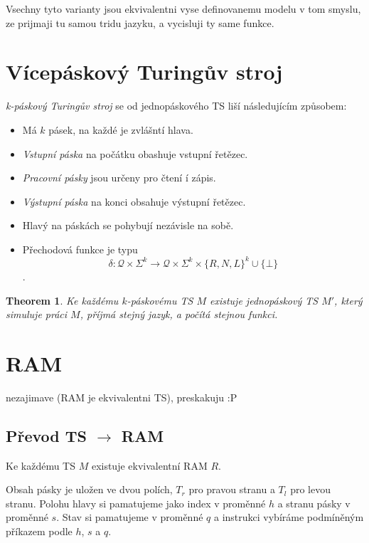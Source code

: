 \documentclass{article}
\theoremstyle{plain}
\newtheorem{thm}{Theorem}
\theoremstyle{plain}
\theoremstyle{remark}
\begin{document}
Vsechny tyto varianty jsou ekvivalentni vyse definovanemu modelu v tom smyslu, ze prijmaji tu samou tridu jazyku, a vycisluji ty same funkce.

\section{Vícepáskový Turingův stroj}

\emph{k-páskový Turingův stroj} se od jednopáskového TS liší následujícím způsobem:

\begin{itemize}
  \item Má $k$ pásek, na každé je zvlášntí hlava.
  \item \emph{Vstupní páska} na počátku obashuje vstupní řetězec.
  \item \emph{Pracovní pásky} jsou určeny pro čtení í zápis.
  \item \emph{Výstupní páska} na konci obsahuje výstupní řetězec.
  \item Hlavý na páskách se pohybují nezávisle na sobě.
  \item Přechodová funkce je typu $$\delta : \mathcal{Q} \times \Sigma^k \rightarrow \mathcal{Q} \times \Sigma^k \times \{ R, N, L \}^k \cup \{ \bot \}$$.
\end{itemize}

\begin{thm}
  Ke každému $k$-páskovému TS $M$ existuje jednopáskový TS $M'$, který simuluje
  práci $M$, příjmá stejný jazyk, a počítá stejnou funkci.
\end{thm}

\section{RAM}

nezajimave (RAM je ekvivalentni TS), preskakuju :P

\subsection{Převod TS $\rightarrow$ RAM}

\begin{theorem}
  Ke každému TS $M$ existuje ekvivalentní RAM $R$.

  Obsah pásky je uložen ve dvou polích, $T_r$ pro pravou stranu a $T_l$ pro
  levou stranu. Polohu hlavy si pamatujeme jako index v proměnné $h$ a stranu
  pásky v proměnné $s$. Stav si pamatujeme v proměnné $q$ a instrukci vybíráme
  podmíněným příkazem podle $h$, $s$ a $q$.
\end{theorem}
\end{document}

